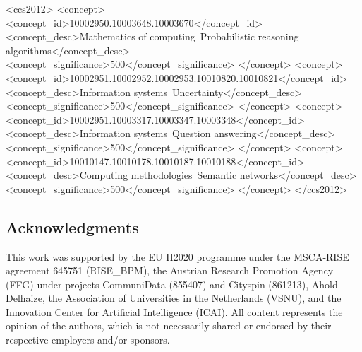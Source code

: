 \documentclass[sigconf,table,screen,review=false,anonymous=false]{acmart}
\begin{document}
%
%
\begin{CCSXML}
<ccs2012>
<concept>
<concept_id>10002950.10003648.10003670</concept_id>
<concept_desc>Mathematics of computing~Probabilistic reasoning algorithms</concept_desc>
<concept_significance>500</concept_significance>
</concept>
<concept>
<concept_id>10002951.10002952.10002953.10010820.10010821</concept_id>
<concept_desc>Information systems~Uncertainty</concept_desc>
<concept_significance>500</concept_significance>
</concept>
<concept>
<concept_id>10002951.10003317.10003347.10003348</concept_id>
<concept_desc>Information systems~Question answering</concept_desc>
<concept_significance>500</concept_significance>
</concept>
<concept>
<concept_id>10010147.10010178.10010187.10010188</concept_id>
<concept_desc>Computing methodologies~Semantic networks</concept_desc>
<concept_significance>500</concept_significance>
</concept>
</ccs2012>
\end{CCSXML}


%

\maketitle









\subsection*{Acknowledgments}
This work was supported by 
the EU H2020 programme under the MSCA-RISE agreement 645751 ({RISE\_BPM}), 
the Austrian Research Promotion Agency (FFG) under projects CommuniData (855407) and Cityspin (861213),
Ahold Delhaize,
the Association of Universities in the Netherlands (VSNU),
and
the Innovation Center for Artificial Intelligence (ICAI).
All content represents the opinion of the authors, which is not necessarily shared or endorsed by their respective employers and/or sponsors.



\end{document}
